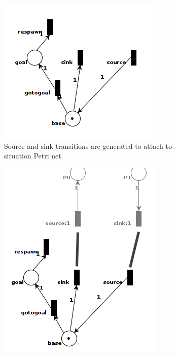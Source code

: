 \documentclass[11pt, a4paper]{book}
\begin{document}
\begin{figure}
\begin{subfigure}[b]{0.4\textwidth}
\includegraphics[width =\textwidth]{petrinet_pictures/rotterdamPedestrianNet_sinksource.png}
\caption{Source and sink transitions are generated to attach to situation Petri net.}
\end{subfigure}
\begin{subfigure}[b]{0.4\textwidth}
\includegraphics[width =\textwidth]{petrinet_pictures/connected.png}

\end{subfigure}
\end{figure}
\end{document}
